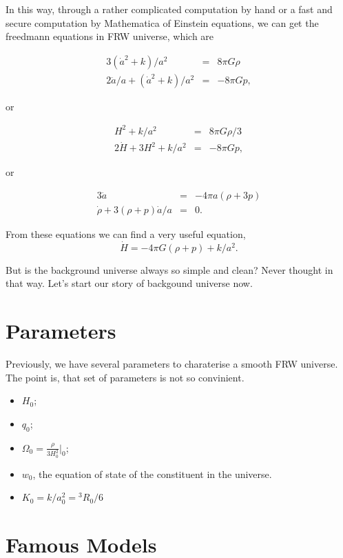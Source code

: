 \documentclass{article}
\begin{document}
In this way, through a rather complicated computation by hand or a fast and secure computation by Mathematica of Einstein equations, we can get the freedmann equations in FRW universe, which are

\begin{eqnarray}
3(\dot a ^2 + k)/a^2 &=& 8 \pi G \rho \\
2 \ddot a/a + (\dot a^2 + k)/a^2 &=& -8 \pi G p  ,
\end{eqnarray}

or

\begin{eqnarray}
H^2 + k/a^2 &=& 8 \pi G \rho /3 \\
2 \dot H + 3H^2 + k/a^2 &=& -8 \pi G p   ,
\end{eqnarray}

or

\begin{eqnarray}
3 \ddot a &=& -4 \pi a (\rho + 3p) \\
\dot \rho + 3 (\rho + p) \dot a/a &=& 0   .
\end{eqnarray}

From these equations we can find a very useful equation,
\begin{equation}
\dot H = -4 \pi G (\rho + p) + k/a^2    .
\end{equation}


But is the background universe always so simple and clean? Never thought in that way. Let's start our story of backgound universe now.


\section{Parameters}

Previously, we have several parameters to charaterise a smooth FRW universe. The point is, that set of parameters is not so convinient.

\begin{itemize}
\item
$H_0$;
\item
$q_0$;
\item
$\Omega_0 = \frac{\rho}{3H_0^2}|_0$;
\item
$w_0$, the equation of state of the constituent in the universe.
\item
$K_0=k/a_0^2={}^3R_0/6$
\end{itemize}


\section{Famous Models}
\end{document}
